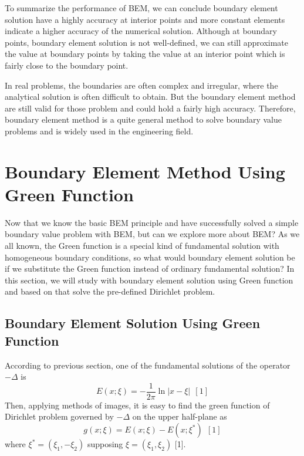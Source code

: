 \documentclass[a4paper,12pt]{article}
\begin{document}
\par To summarize the performance of BEM, we can conclude boundary element solution have a highly accuracy at interior points and more constant elements indicate a higher accuracy of the numerical solution. Although at boundary points, boundary element solution is not well-defined, we can still approximate the value at boundary points by taking the value at an interior point which is fairly close to the boundary point. 

\par In real problems, the boundaries are often complex and irregular, where the analytical solution is often difficult to obtain. But the boundary element method are still valid for those problem and could hold a fairly high accuracy. Therefore, boundary element method is a quite general method to solve boundary value problems and is widely used in the engineering field. 
\section{Boundary Element Method Using Green Function} 
Now that we know the basic BEM principle and have successfully solved a simple boundary value problem with BEM, but can we explore more about BEM? As we all known, the Green function is a special kind of fundamental solution with homogeneous boundary conditions, so what would boundary element solution be if we substitute the Green function instead of ordinary fundamental solution? In this section, we will study with boundary element solution using Green function and based on that solve the pre-defined Dirichlet problem.
\subsection{Boundary Element Solution Using Green Function} 
\par According to previous section, one of the fundamental solutions of  the operator $-\Delta$ is
\begin{equation*}
E(x;\xi) = - \frac{1}{2\pi}\ln|x -\xi| \ \ [1]
\end{equation*}
Then, applying methods of images, it is easy to find the green function of Dirichlet problem governed by $-\Delta$ on the upper half-plane as
\begin{equation}
g(x;\xi) = E(x;\xi) - E(x;\xi^*) \ \ [1]
\end{equation}  
where $\xi^* = (\xi_1,-\xi_2)$ supposing $\xi = (\xi_1,\xi_2)$ [1]. 
\end{document}
